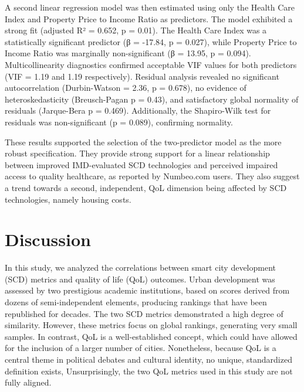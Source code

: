 \documentclass[
  english,
  12pt,
  a4paper,
]{scrartcl}
\begin{document}
A second linear regression model was then estimated using only the
Health Care Index and Property Price to Income Ratio as predictors. The
model exhibited a strong fit (adjusted R² = 0.652, p = 0.01). The Health
Care Index was a statistically significant predictor (β = -17.84, p =
0.027), while Property Price to Income Ratio was marginally
non-significant (β = 13.95, p = 0.094). Multicollinearity diagnostics
confirmed acceptable VIF values for both predictors (VIF = 1.19 and 1.19
respectively). Residual analysis revealed no significant autocorrelation
(Durbin-Watson = 2.36, p = 0.678), no evidence of heteroskedasticity
(Breusch-Pagan p = 0.43), and satisfactory global normality of residuals
(Jarque-Bera p = 0.469). Additionally, the Shapiro-Wilk test for
residuals was non-significant (p = 0.089), confirming normality.

These results supported the selection of the two-predictor model as the
more robust specification. They provide strong support for a linear
relationship between improved IMD-evaluated SCD technologies and
perceived impaired access to quality healthcare, as reported by
Numbeo.com users. They also suggest a trend towards a second,
independent, QoL dimension being affected by SCD technologies, namely
housing costs.

\section{Discussion}\label{discussion}

In this study, we analyzed the correlations between smart city
development (SCD) metrics and quality of life (QoL) outcomes. Urban
development was assessed by two prestigious academic institutions, based
on scores derived from dozens of semi-independent elements, producing
rankings that have been republished for decades. The two SCD metrics
demonstrated a high degree of similarity. However, these metrics focus
on global rankings, generating very small samples. In contrast, QoL is a
well-established concept, which could have allowed for the inclusion of
a larger number of cities. Nonetheless, because QoL is a central theme
in political debates and cultural identity, no unique, standardized
definition exists, Unsurprisingly, the two QoL metrics used in this
study are not fully aligned.
\end{document}
